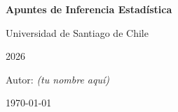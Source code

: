 \documentclass[12pt, a4paper, spanish]{article}
\theoremstyle{definition}
\theoremstyle{plain}
\theoremstyle{remark}
\begin{document}
\begin{titlepage}
  \centering
  \vspace*{2cm}
  {\LARGE\bfseries Apuntes de Inferencia Estadística\par}
  \vspace{0.5cm}
  {\large Universidad de Santiago de Chile\par}
  \vspace{0.3cm}
  {\large 2026\par}
  \vfill
  {\normalsize Autor: \textit{(tu nombre aquí)}\par}
  \vspace{0.5cm}
  {\small \today\par}
\end{titlepage}

\tableofcontents
\newpage





\end{document}
